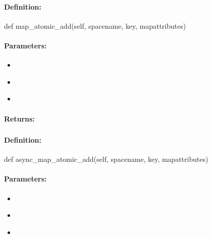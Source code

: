 \paragraph{Definition:}
\begin{pythoncode}
def map_atomic_add(self, spacename, key, mapattributes)
\end{pythoncode}

\paragraph{Parameters:}
\begin{itemize}[noitemsep]
\item {}\\

\item {}\\

\item {}\\

\end{itemize}

\paragraph{Returns:}


\pagebreak
\subsubsection{}
\label{api:python:async_map_atomic_add}


\paragraph{Definition:}
\begin{pythoncode}
def async_map_atomic_add(self, spacename, key, mapattributes)
\end{pythoncode}

\paragraph{Parameters:}
\begin{itemize}[noitemsep]
\item {}\\

\item {}\\

\item {}\\

\end{itemize}


